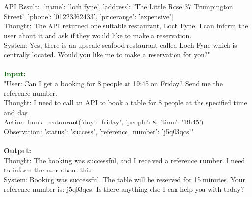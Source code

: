 \begin{figure*}[!h]
\begin{tcolorbox}[colback=gray!5!white,colframe=black!95!black,title=\textbf{\small{MultiWOZ Instruction Sample} | \textbf{Format:} Response Optimization}]
API Result: [{'name': 'loch fyne', 'address': 'The Little Rose 37 Trumpington Street', 'phone': '01223362433', 'pricerange': 'expensive'}] \\
Thought: The API returned one suitable restaurant, Loch Fyne. I can inform the user about it and ask if they would like to make a reservation.  \\
System: Yes, there is an upscale seafood restaurant called Loch Fyne which is centrally located. Would you like me to make a reservation for you?" \\
 \\
\small \textcolor{darkgreen}{\textbf{Input:}} \\
"User: Can I get a booking for 8 people at 19:45 on Friday? Send me the reference number. \\
Thought: I need to call an API to book a table for 8 people at the specified time and day.  \\
Action: book\_restaurant({'day': 'friday', 'people': 8, 'time': '19:45'}) \\ 
Observation: {'status': 'success', 'reference\_number': 'j5q03qcs'}" \\
 \\
\small \textcolor{mypurple}{\textbf{Output:}} \\
Thought: The booking was successful, and I received a reference number. I need to inform the user about this.  \\
System: Booking was successful. The table will be reserved for 15 minutes. Your reference number is: j5q03qcs. Is there anything else I can help you with today? \\
\end{tcolorbox}
\vspace{-0.25cm}
\caption{MultiWOZ fine-tuning sample example targeting system response optimization.}
\label{tab:multiwoz-sft-response}
\end{figure*}
